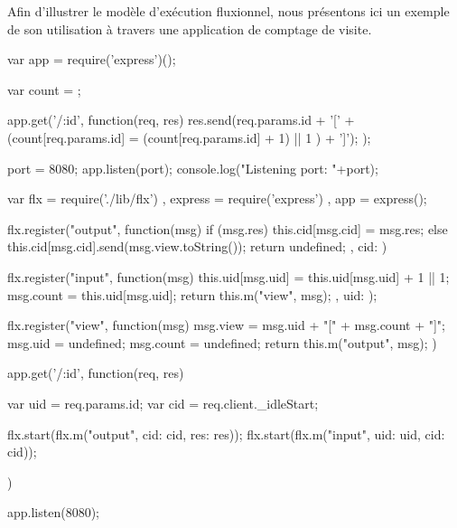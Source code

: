 Afin d'illustrer le modèle d'exécution fluxionnel, nous présentons ici un exemple de son utilisation à travers une application de comptage de visite.

\begin{code}
var app = require('express')();

var count = {};

app.get('/:id', function(req, res){
  res.send(req.params.id + '[' + (count[req.params.id] = (count[req.params.id] + 1) || 1 ) + ']');
});

port = 8080;
app.listen(port);
console.log("Listening port: "+port);
\end{code}


\begin{code}
var flx = require('./lib/flx')
  , express = require('express')
  , app = express();

flx.register("output", function(msg){
  if (msg.res) {
    this.cid[msg.cid] = msg.res;
  } else {
    this.cid[msg.cid].send(msg.view.toString());
  }
  return undefined;
}, {
  cid: {}
})

flx.register("input", function(msg){
  this.uid[msg.uid] = this.uid[msg.uid] + 1 || 1;
  msg.count = this.uid[msg.uid];
  return this.m("view", msg);
},{
  uid: {}
});

flx.register("view", function(msg) {
  msg.view = msg.uid + "[" + msg.count + "]";
  msg.uid = undefined;
  msg.count = undefined;
  return this.m("output", msg);
})

app.get('/:id', function(req, res) {
  var uid = req.params.id;
  var cid = req.client._idleStart;

  flx.start(flx.m("output", {cid: cid, res: res}));
  flx.start(flx.m("input", {uid: uid, cid: cid}));
})

app.listen(8080);
\end{code}


